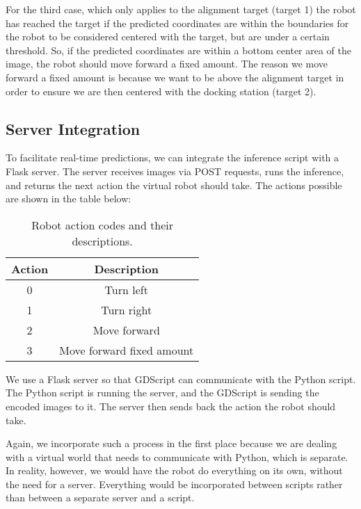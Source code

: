 

For the third case, which only applies to the alignment target (target 1) the robot has reached the target if the predicted coordinates are within the boundaries for the robot to be considered centered with the target, but are under a certain threshold. So, if the predicted coordinates are within a bottom center area of the image, the robot should move forward a fixed amount. The reason we move forward a fixed amount is because we want to be above the alignment target in order to ensure we are then centered with the docking station (target 2).

\subsection{Server Integration}
To facilitate real-time predictions, we can integrate the inference script with a Flask server. The server receives images via POST requests, runs the inference, and returns the next action the virtual robot should take. The actions possible are shown in the table below:

\begin{table}[htbp]
	\centering
	\begin{tabular}{|c|c|}
		\hline
		Action & Description \\ \hline
		0      & Turn left   \\ \hline
		1      & Turn right  \\ \hline
		2      & Move forward \\ \hline
		3      & Move forward fixed amount \\ \hline
	\end{tabular}
	\caption{Robot action codes and their descriptions.}
	\label{tab:robot_actions}
\end{table}

We use a Flask server so that GDScript can communicate with the Python script. The Python script is running the server, and the GDScript is sending the encoded images to it. The server then sends back the action the robot should take.

Again, we incorporate such a process in the first place because we are dealing with a virtual world that needs to communicate with Python, which is separate. In reality, however, we would have the robot do everything on its own, without the need for a server. Everything would be incorporated between scripts rather than between a separate server and a script.

